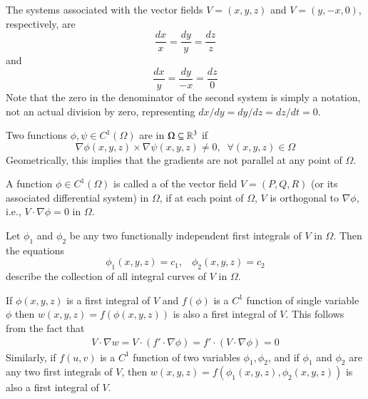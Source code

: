     \begin{example}
        The systems associated with the vector fields $V = (x,y,z)$ and $V = (y,-x,0)$, respectively, are $$\frac{dx}{x} = \frac{dy}{y} = \frac{dz}{z}$$ and $$\frac{dx}{y} = \frac{dy}{-x} = \frac{dz}{0}$$ Note that the zero in the denominator of the second system is simply a notation, not an actual division by zero, representing $dx/dy = dy/dz = dz/dt = 0$.
    \end{example}

    \begin{definition}
        Two functions $\phi,\psi \in C^1(\Omega)$ are  in $\Omega \subseteq \mathbb R^3$ if \begin{equation*}
            \nabla \phi(x,y,z)\times \nabla\psi(x,y,z) \neq 0,\;\;\forall (x,y,z) \in \Omega
        \end{equation*}
        Geometrically, this implies that the gradients are not parallel at any point of $\Omega$.
    \end{definition}

    \begin{definition}
        A function $\phi \in C^1(\Omega)$ is called a  of the vector field $V= (P,Q,R)$ (or its associated differential system) in $\Omega$, if at each point of $\Omega$, $V$ is orthogonal to $\nabla \phi$, i.e., $V\cdot \nabla \phi = 0$ in $\Omega$.
    \end{definition}

    \begin{theorem}
        Let $\phi_1$ and $\phi_2$ be any two functionally independent first integrals of $V$ in $\Omega$. Then the equations \begin{equation*}
            \phi_1(x,y,z) = c_1,\;\;\;\phi_2(x,y,z) = c_2
        \end{equation*}
        describe the collection of all integral curves of $V$ in $\Omega$.
    \end{theorem}


    If $\phi(x,y,z)$ is a first integral of $V$ and $f(\phi)$ is a $C^1$ function of single variable $\phi$ then $w(x,y,z) = f(\phi(x,y,z))$ is also a first integral of $V$. This follows from the fact that \begin{align*}
        V \cdot \nabla w = V \cdot (f'\cdot \nabla \phi) = f'\cdot(V\cdot \nabla \phi) = 0
    \end{align*}
    Similarly, if $f(u,v)$ is a $C^1$ function of two variables $\phi_1,\phi_2$, and if $\phi_1$ and $\phi_2$ are any two first integrals of $V$, then $w(x,y,z) = f(\phi_1(x,y,z),\phi_2(x,y,z))$ is also a first integral of $V$.


